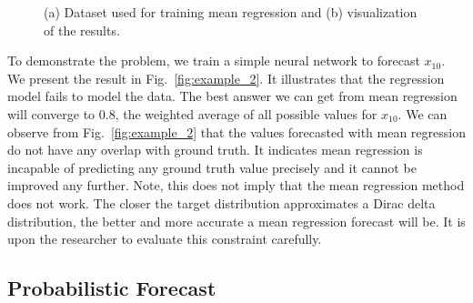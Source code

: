 \documentclass{ieeeaccess}
\begin{document}
\begin{figure*}[t]
	\centering
	\hfill
	\caption{(a) Dataset used for training mean regression and (b) visualization of the results.}
	\label{fig:example} 
\end{figure*}
To demonstrate the problem, we train a simple neural network to forecast $x_{10}$. We present the result in Fig.~\ref{fig:example_2}. It illustrates that the regression model fails to model the data. The best answer we can get from mean regression will converge to $0.8$, the weighted average of all possible values for $x_{10}$. We can observe from Fig.~\ref{fig:example_2} that the values forecasted with mean regression do not have any overlap with ground truth. It indicates mean regression is incapable of predicting any ground truth value precisely and it cannot be improved any further. Note, this does not imply that the mean regression method does not work. The closer the target distribution approximates a Dirac delta distribution, the better and more accurate a mean regression forecast will be. It is upon the researcher to evaluate this constraint carefully.

\subsection{Probabilistic Forecast}
\end{document}
